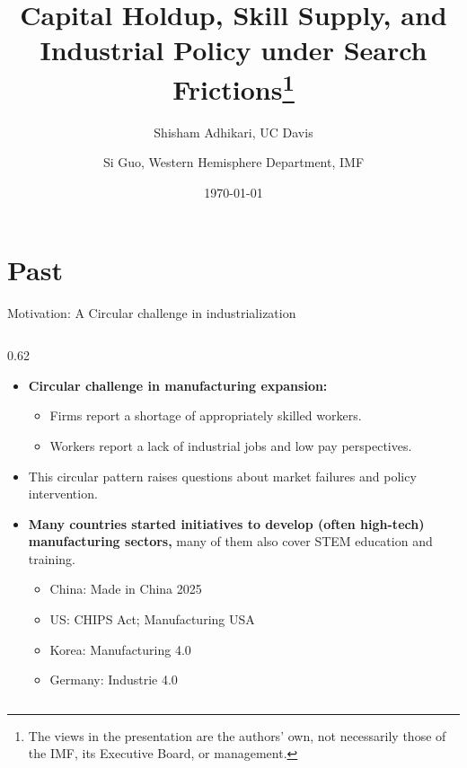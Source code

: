 \documentclass[9pt,xcolor={svgnames}]{beamer}
\title[Bridging the Manufacturing Gap]{\large \textbf{Capital Holdup, Skill Supply, and Industrial Policy under Search Frictions\footnote{The views in the presentation are the authors' own, not necessarily those of the IMF, its Executive Board, or management.}\\ %
}
}
\author{Shisham Adhikari, UC Davis \\  %
\vspace{3mm}
\and Si Guo, Western Hemisphere Department,  IMF}    %
\date[Davis]{%
  \today
}
\begin{document}
\begin{frame}
\titlepage %
\end{frame}



\section{Past} 
\begin{frame}{Motivation: A Circular challenge in industrialization}

\setlength{\columnsep}{8pt}

\begin{columns}[T,onlytextwidth]
\begin{column}{0.62\textwidth}
 \begin{itemize}
    \item \textbf{Circular challenge in manufacturing expansion:} 
    \begin{itemize}
        \item Firms report a shortage of appropriately skilled workers.
        \item Workers report a lack of industrial jobs and low pay perspectives.
    \end{itemize}
    
    \vspace{4mm}

    \item This circular pattern raises questions about market failures and policy intervention. 
    
    \vspace{4mm}
    
    \item \textbf{Many countries started initiatives to develop (often high-tech) manufacturing sectors,} 
    many of them also cover STEM education and training.
    \begin{itemize}
        \item China: Made in China 2025
        \item US: CHIPS Act; Manufacturing USA
        \item Korea: Manufacturing 4.0 
        \item Germany: Industrie 4.0
    \end{itemize}
  \end{itemize}
\end{column}


\end{columns}
\end{frame}
\end{document}
